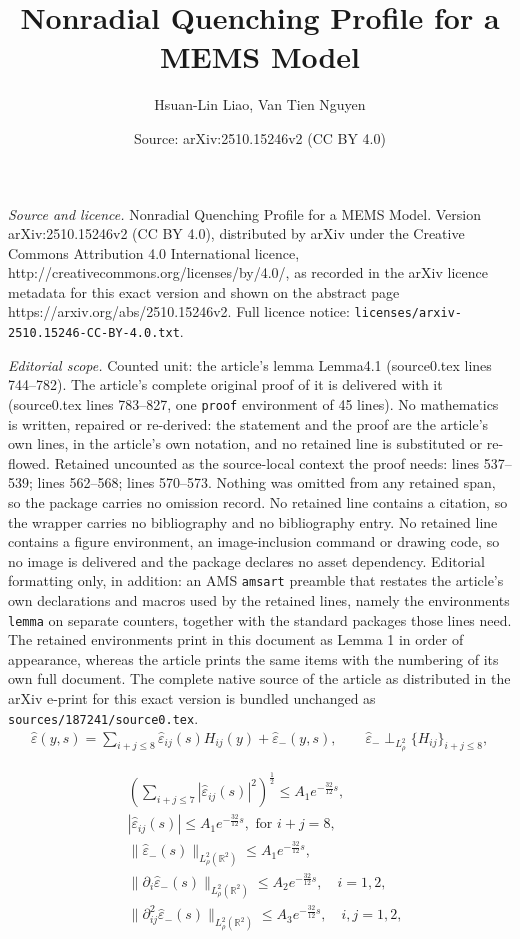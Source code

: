 \documentclass[10pt,a4paper]{amsart}
\title{Nonradial Quenching Profile for a MEMS Model}
\author{Hsuan-Lin Liao, Van Tien Nguyen}
\date{Source: arXiv:2510.15246v2 (CC BY 4.0)}
\newcommand{\veph}{\hat\varepsilon }
\begin{document}
\maketitle

\noindent\emph{Source and licence.} Nonradial Quenching Profile for a MEMS Model. Version arXiv:2510.15246v2 (CC BY 4.0), distributed by arXiv under the Creative Commons Attribution 4.0 International licence, http://creativecommons.org/licenses/by/4.0/, as recorded in the arXiv licence metadata for this exact version and shown on the abstract page https://arxiv.org/abs/2510.15246v2. Full licence notice: \texttt{licenses/arxiv-2510.15246-CC-BY-4.0.txt}.\par\smallskip

\noindent\textit{Editorial scope.} Counted unit: the article's lemma Lemma4.1 (source0.tex lines 744--782). The article's complete original proof of it is delivered with it (source0.tex lines 783--827, one \texttt{proof} environment of 45 lines). No mathematics is written, repaired or re-derived: the statement and the proof are the article's own lines, in the article's own notation, and no retained line is substituted or re-flowed.  Retained uncounted as the source-local context the proof needs: lines 537--539; lines 562--568; lines 570--573.  Nothing was omitted from any retained span, so the package carries no omission record.  No retained line contains a citation, so the wrapper carries no bibliography and no bibliography entry.  No retained line contains a figure environment, an image-inclusion command or drawing code, so no image is delivered and the package declares no asset dependency.  Editorial formatting only, in addition: an AMS \texttt{amsart} preamble that restates the article's own declarations and macros used by the retained lines, namely the environments \texttt{lemma} on separate counters, together with the standard packages those lines need.  The retained environments print in this document as Lemma 1 in order of appearance, whereas the article prints the same items with the numbering of its own full document.  The complete native source of the article as distributed in the arXiv e-print for this exact version is bundled unchanged as \texttt{sources/187241/source0.tex}.
\begin{align}
    \veph(y,s)=\sum_{i+j \leq 8}\veph_{ij}(s)H_{ij}(y)+\veph_-(y,s),\label{decomoin} \quad \quad \veph_- \perp_{L^2_\rho} \{H_{ij}\}_{i+j \leq 8},
\end{align}

\begin{align}
    &\left( \sum_{i+j \leq 7} |\veph_{ij}(s)|^2 \right)^{\frac{1}{2}} \leq A_1 e^{-\frac{32}{12}s},\label{in1}\\
    &|\veph_{ij}(s)| \leq A_1e^{-\frac{32}{12}s}, \text{ for } i+j =8, \label{in2}\\
    &\|\veph_-(s)\|_{L^2_{\rho}(\mathbb{R}^2)} \leq A_1 e^{-\frac{32}{12}s} \label{in3},\\
    &\|\partial_i\veph_-(s)\|_{L^2_{\rho}(\mathbb{R}^2)} \leq A_2 e^{-\frac{32}{12}s}, \quad i=1,2,\label{in4}\\
    &\|\partial^2_{ij}\veph_-(s)\|_{L^2_{\rho}(\mathbb{R}^2)} \leq A_3 e^{-\frac{32}{12}s}, \quad i,j=1,2, \label{in5}
\end{align}
\end{document}
